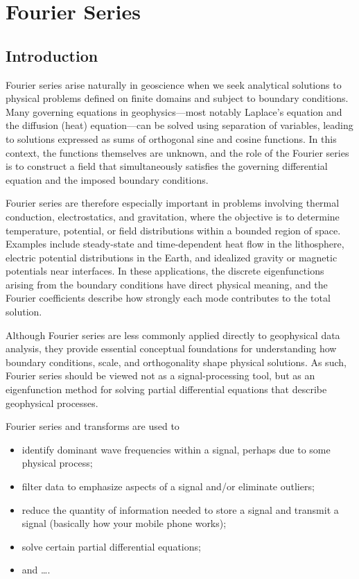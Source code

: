 \chapter{Fourier Series}\label{ch:fourier_series}
\section{Introduction}

Fourier series arise naturally in geoscience when we seek analytical solutions to physical problems defined on finite domains and subject to boundary conditions. Many governing equations in geophysics—most notably Laplace's equation and the diffusion (heat) equation—can be solved using separation of variables, leading to solutions expressed as sums of orthogonal sine and cosine functions. In this context, the functions themselves are unknown, and the role of the Fourier series is to construct a field that simultaneously satisfies the governing differential equation and the imposed boundary conditions.

Fourier series are therefore especially important in problems involving thermal conduction, electrostatics, and gravitation, where the objective is to determine temperature, potential, or field distributions within a bounded region of space. Examples include steady-state and time-dependent heat flow in the lithosphere, electric potential distributions in the Earth, and idealized gravity or magnetic potentials near interfaces. In these applications, the discrete eigenfunctions arising from the boundary conditions have direct physical meaning, and the Fourier coefficients describe how strongly each mode contributes to the total solution.

Although Fourier series are less commonly applied directly to geophysical data analysis, they provide essential conceptual foundations for understanding how boundary conditions, scale, and orthogonality shape physical solutions. As such, Fourier series should be viewed not as a signal-processing tool, but as an eigenfunction method for solving partial differential equations that describe geophysical processes.

Fourier series and transforms are used to
\begin{itemize}
    \item identify dominant wave frequencies within a signal, perhaps due to some physical process;
    \item filter data to emphasize aspects of a signal and/or eliminate outliers;
    \item reduce the quantity of information needed to store a signal and transmit a signal (basically how your mobile phone works);
    \item solve certain partial differential equations;
    \item and \ldots .
\end{itemize}



